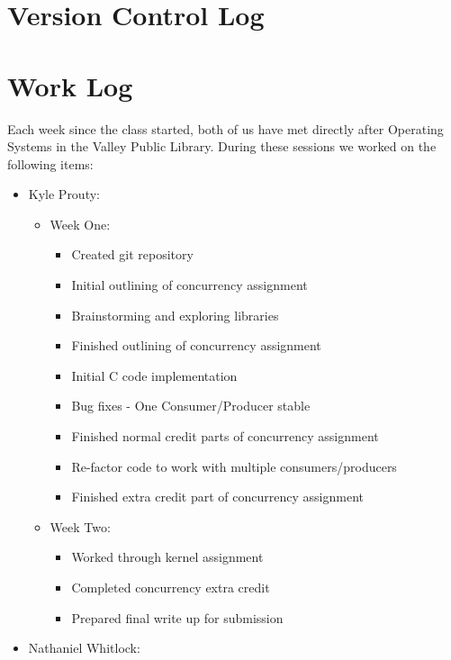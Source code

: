 \documentclass[letterpaper,10pt]{article}
\begin{document}
\section{Version Control Log}



\section{Work Log}
Each week since the class started, both of us have met directly after Operating Systems in the Valley Public Library. During these sessions we worked on the following items:
\begin{itemize}
  \item Kyle Prouty: 
    \begin{itemize}
          \item Week One:
          \begin{itemize}
              \item Created git repository
              \item Initial outlining of concurrency assignment
              \item Brainstorming and exploring libraries
              \item Finished outlining of concurrency assignment
              \item Initial C code implementation
              \item Bug fixes - One Consumer/Producer stable
              \item Finished normal credit parts of concurrency assignment
              \item Re-factor code to work with multiple consumers/producers
              \item Finished extra credit part of concurrency assignment
          \end{itemize}
          \item Week Two:
          \begin{itemize}
              \item Worked through kernel assignment
              \item Completed concurrency extra credit
              \item Prepared final write up for submission
          \end{itemize}
        \end{itemize}
    \item Nathaniel Whitlock:
    \begin{itemize}

\end{itemize}
\end{itemize}
\end{document}
